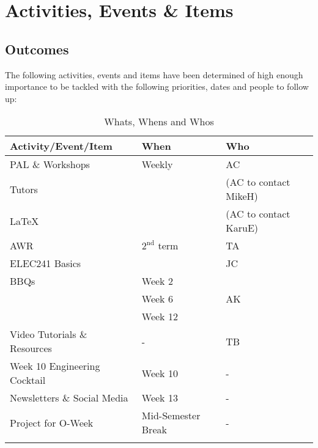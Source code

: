 \section{Activities, Events \& Items}
\label{sec:Whats}
\subsection{Outcomes}
The following activities, events and items have been determined of high enough
importance to be tackled with the following priorities, dates and people to
follow up:
\begin{table}[!htb]
\label{tab:WhatsWhensWhos}
\begin{tabularx}{\linewidth}{X l l} \hline
  Activity/Event/Item          & When & Who \\
                                 \hline \hline
  PAL \& Workshops             & Weekly & AC \\
  Tutors                       & & (AC to contact MikeH) \\
  \LaTeX                       & & (AC to contact KaruE) \\
  AWR                          & $2^{\text{nd}}$ term & TA \\
  ELEC241 Basics               & & JC \\
  \hline
  BBQs                         & Week 2    &    \\
                               & Week 6    & AK \\
                               & Week 12   &    \\
  Video Tutorials \& Resources & - & TB \\
  \hline
  Week 10 Engineering Cocktail & Week 10 & - \\
  Newsletters \& Social Media & Week 13 & - \\
  Project for O-Week & Mid-Semester Break & - \\
  \hline \\
\end{tabularx}
\caption{Whats, Whens and Whos}
\end{table}

